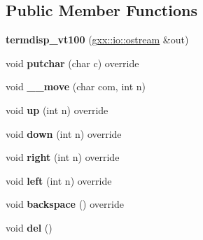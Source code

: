 \subsection*{Public Member Functions}
\begin{DoxyCompactItemize}
\item 
{\bfseries termdisp\+\_\+vt100} (\hyperlink{classgxx_1_1io_1_1ostream}{gxx\+::io\+::ostream} \&out)\hypertarget{classgxx_1_1termdisp__vt100_a701a08fca61423ed8fd2a87bb771d76f}{}\label{classgxx_1_1termdisp__vt100_a701a08fca61423ed8fd2a87bb771d76f}

\item 
void {\bfseries putchar} (char c) override\hypertarget{classgxx_1_1termdisp__vt100_a2708abd4d4a1cc3a5d3d285ea2f2ad18}{}\label{classgxx_1_1termdisp__vt100_a2708abd4d4a1cc3a5d3d285ea2f2ad18}

\item 
void {\bfseries \+\_\+\+\_\+move} (char com, int n)\hypertarget{classgxx_1_1termdisp__vt100_a7c3401c8eb80b9b1b277b7b1d909542f}{}\label{classgxx_1_1termdisp__vt100_a7c3401c8eb80b9b1b277b7b1d909542f}

\item 
void {\bfseries up} (int n) override\hypertarget{classgxx_1_1termdisp__vt100_a3f0d8c7d45e2af747d526bb40514bafc}{}\label{classgxx_1_1termdisp__vt100_a3f0d8c7d45e2af747d526bb40514bafc}

\item 
void {\bfseries down} (int n) override\hypertarget{classgxx_1_1termdisp__vt100_af97c9c54b264ff7f62c3f7a71f8c2cb7}{}\label{classgxx_1_1termdisp__vt100_af97c9c54b264ff7f62c3f7a71f8c2cb7}

\item 
void {\bfseries right} (int n) override\hypertarget{classgxx_1_1termdisp__vt100_aaea090151e1bc12c2b2931250c43bbac}{}\label{classgxx_1_1termdisp__vt100_aaea090151e1bc12c2b2931250c43bbac}

\item 
void {\bfseries left} (int n) override\hypertarget{classgxx_1_1termdisp__vt100_ad4b589c83c3907e988b1bfb1c96ba208}{}\label{classgxx_1_1termdisp__vt100_ad4b589c83c3907e988b1bfb1c96ba208}

\item 
void {\bfseries backspace} () override\hypertarget{classgxx_1_1termdisp__vt100_a9dc8f27dca7a07a571d02223a0d81541}{}\label{classgxx_1_1termdisp__vt100_a9dc8f27dca7a07a571d02223a0d81541}

\item 
void {\bfseries del} ()\hypertarget{classgxx_1_1termdisp__vt100_acb8f4b2b32c80307e2a6b44c9b96901f}{}\label{classgxx_1_1termdisp__vt100_acb8f4b2b32c80307e2a6b44c9b96901f}


\end{DoxyCompactItemize}
